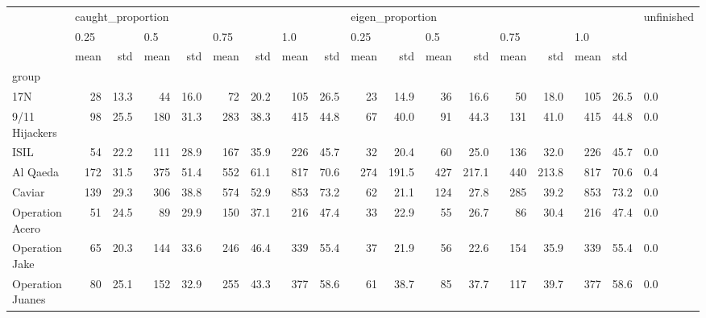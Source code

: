 \begin{tabular}{lrrrrrrrrrrrrrrrrl}
\toprule
{} & \multicolumn{8}{l}{caught\_proportion} & \multicolumn{8}{l}{eigen\_proportion} & unfinished \\
{} & \multicolumn{2}{l}{0.25} & \multicolumn{2}{l}{0.5} & \multicolumn{2}{l}{0.75} & \multicolumn{2}{l}{1.0} & \multicolumn{2}{l}{0.25} & \multicolumn{2}{l}{0.5} & \multicolumn{2}{l}{0.75} & \multicolumn{3}{l}{1.0} \\
{} &              mean &   std & mean &   std & mean &   std & mean &   std &             mean &    std & mean &    std & mean &    std & mean & \multicolumn{2}{l}{std} \\
group                &                   &       &      &       &      &       &      &       &                  &        &      &        &      &        &      &       &            \\
\midrule
17N                  &                28 &  13.3 &   44 &  16.0 &   72 &  20.2 &  105 &  26.5 &               23 &   14.9 &   36 &   16.6 &   50 &   18.0 &  105 &  26.5 &        0.0 \\
9/11 Hijackers       &                98 &  25.5 &  180 &  31.3 &  283 &  38.3 &  415 &  44.8 &               67 &   40.0 &   91 &   44.3 &  131 &   41.0 &  415 &  44.8 &        0.0 \\
ISIL                 &                54 &  22.2 &  111 &  28.9 &  167 &  35.9 &  226 &  45.7 &               32 &   20.4 &   60 &   25.0 &  136 &   32.0 &  226 &  45.7 &        0.0 \\
Al Qaeda             &               172 &  31.5 &  375 &  51.4 &  552 &  61.1 &  817 &  70.6 &              274 &  191.5 &  427 &  217.1 &  440 &  213.8 &  817 &  70.6 &        0.4 \\
Caviar               &               139 &  29.3 &  306 &  38.8 &  574 &  52.9 &  853 &  73.2 &               62 &   21.1 &  124 &   27.8 &  285 &   39.2 &  853 &  73.2 &        0.0 \\
Operation Acero      &                51 &  24.5 &   89 &  29.9 &  150 &  37.1 &  216 &  47.4 &               33 &   22.9 &   55 &   26.7 &   86 &   30.4 &  216 &  47.4 &        0.0 \\
Operation Jake       &                65 &  20.3 &  144 &  33.6 &  246 &  46.4 &  339 &  55.4 &               37 &   21.9 &   56 &   22.6 &  154 &   35.9 &  339 &  55.4 &        0.0 \\
Operation Juanes     &                80 &  25.1 &  152 &  32.9 &  255 &  43.3 &  377 &  58.6 &               61 &   38.7 &   85 &   37.7 &  117 &   39.7 &  377 &  58.6 &        0.0 \\

\end{tabular}
